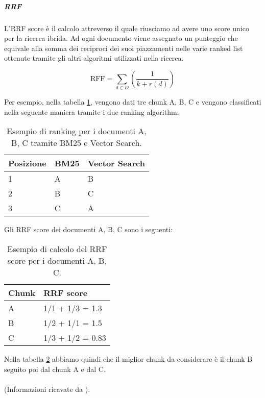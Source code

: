 \subparagraph{\gls{RRF}}
L'RRF score è il calcolo attreverso il quale riusciamo ad avere uno score unico per la ricerca ibrida.
Ad ogni documento viene assegnato un punteggio che equivale alla somma dei reciproci dei suoi piazzamenti nelle varie ranked list ottenute tramite gli altri algoritmi utilizzati nella ricerca.

\[
\text{RFF} = \sum_{d \in D} (\frac{1}{k+r(d)})    
\]

\noindent Per esempio, nella tabella \ref{tab:ranking}, vengono dati tre chunk A, B, C e vengono classificati nella seguente maniera tramite i due ranking algorithm:

\begin{table}[H]
    \centering
    \begin{tabular}{|p{2cm} |p{2cm} |p{2cm}|}
        \hline
        Posizione & BM25 & Vector Search \\
        \hline
        1 & A & B \\
        \hline
        2 & B & C \\
        \hline
        3 & C & A \\
        \hline
    \end{tabular}
    \caption{Esempio di ranking per i documenti A, B, C tramite BM25 e Vector Search.}
    \label{tab:ranking}
\end{table}

\noindent Gli RRF score dei documenti A, B, C sono i seguenti:
\begin{table}[H]
    \centering
    \begin{tabular}{|p{3cm} | p{3cm} |}
        \hline
        Chunk & RRF score \\
        \hline
        A & 1/1 + 1/3 = 1.3\\
        \hline
        B & 1/2 + 1/1 = 1.5\\
        \hline
        C & 1/3 + 1/2 = 0.83\\
        \hline
    \end{tabular}
    \caption{Esempio di calcolo del RRF score per i documenti A, B, C.}
    \label{tab:hybridrank}
\end{table}

\noindent Nella tabella \ref{tab:hybridrank} abbiamo quindi che il miglior chunk da considerare è il chunk B seguito poi dal chunk A e dal C.\\
\\
\noindent (Informazioni ricavate da \cite{site:weaviate-hybrid-search}).

